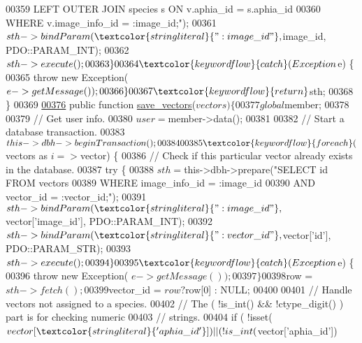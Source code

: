 \begin{DoxyCode}
{00359 \textcolor{stringliteral}{                LEFT OUTER JOIN species s ON v.aphia\_id = s.aphia\_id}
00360 \textcolor{stringliteral}{            WHERE v.image\_info\_id = :image\_id;"});
00361             $sth->bindParam(\textcolor{stringliteral}{":image\_id"}, $image\_id, PDO::PARAM\_INT);
00362             $sth->execute();
00363         \}
00364         \textcolor{keywordflow}{catch} (Exception $e) \{
00365             \textcolor{keywordflow}{throw} \textcolor{keyword}{new} Exception( $e->getMessage() );
00366         \}
00367         \textcolor{keywordflow}{return} $sth;
00368     \}
00369 
\hypertarget{Database_8php_source_l00376}{}\hyperlink{classDatabase_a9cbb05bd40bab06c6d1900b9e1905613}{00376}     \textcolor{keyword}{public} \textcolor{keyword}{function} \hyperlink{classDatabase_a9cbb05bd40bab06c6d1900b9e1905613}{save\_vectors}($vectors) \{
00377         global $member;
00378 
00379         \textcolor{comment}{// Get user info.}
00380         $user = $member->data();
00381 
00382         \textcolor{comment}{// Start a database transaction.}
00383         $this->dbh->beginTransaction();
00384 
00385         \textcolor{keywordflow}{foreach} ($vectors as $i => $vector) \{
00386             \textcolor{comment}{// Check if this particular vector already exists in the database.}
00387             \textcolor{keywordflow}{try} \{
00388                 $sth = $this->dbh->prepare(\textcolor{stringliteral}{"SELECT id FROM vectors}
00389 \textcolor{stringliteral}{                    WHERE image\_info\_id = :image\_id}
00390 \textcolor{stringliteral}{                        AND vector\_id = :vector\_id;"});
00391                 $sth->bindParam(\textcolor{stringliteral}{":image\_id"}, $vector[\textcolor{stringliteral}{'image\_id'}], 
      PDO::PARAM\_INT);
00392                 $sth->bindParam(\textcolor{stringliteral}{":vector\_id"}, $vector[\textcolor{stringliteral}{'id'}], PDO::PARAM\_STR);
00393                 $sth->execute();
00394             \}
00395             \textcolor{keywordflow}{catch} (Exception $e) \{
00396                 \textcolor{keywordflow}{throw} \textcolor{keyword}{new} Exception( $e->getMessage() );
00397             \}
00398             $row = $sth->fetch();
00399             $vector\_id = $row ? $row[0] : NULL;
00400 
00401             \textcolor{comment}{// Handle vectors not assigned to a species.}
00402             \textcolor{comment}{// The ( !is\_int() && !ctype\_digit() ) part is for checking numeric}
00403             \textcolor{comment}{// strings.}
00404             \textcolor{keywordflow}{if} ( !isset($vector[\textcolor{stringliteral}{'aphia\_id'}]) || ( !is\_int($vector[\textcolor{stringliteral}{'aphia\_id'}]) 
}
\end{DoxyCode}
